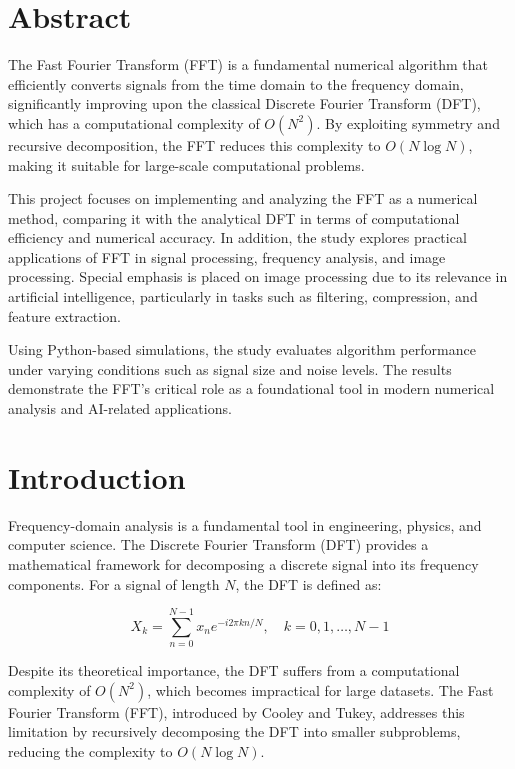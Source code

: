 \documentclass{zc-ust-hw}
\begin{document}
\maketitle
\tableofcontents
\pagebreak

\section{Abstract}
The Fast Fourier Transform (FFT) is a fundamental numerical algorithm that efficiently converts signals from the time domain to the frequency domain, significantly improving upon the classical Discrete Fourier Transform (DFT), which has a computational complexity of \(O(N^2)\). By exploiting symmetry and recursive decomposition, the FFT reduces this complexity to \(O(N \log N)\), making it suitable for large-scale computational problems.

This project focuses on implementing and analyzing the FFT as a numerical method, comparing it with the analytical DFT in terms of computational efficiency and numerical accuracy. In addition, the study explores practical applications of FFT in signal processing, frequency analysis, and image processing. Special emphasis is placed on image processing due to its relevance in artificial intelligence, particularly in tasks such as filtering, compression, and feature extraction.

Using Python-based simulations, the study evaluates algorithm performance under varying conditions such as signal size and noise levels. The results demonstrate the FFT’s critical role as a foundational tool in modern numerical analysis and AI-related applications.

\section{Introduction}
Frequency-domain analysis is a fundamental tool in engineering, physics, and computer science. The Discrete Fourier Transform (DFT) provides a mathematical framework for decomposing a discrete signal into its frequency components. For a signal of length \(N\), the DFT is defined as:

\begin{equation}
X_k = \sum_{n=0}^{N-1} x_n e^{-i 2\pi kn/N}, \quad k = 0,1,\dots,N-1
\end{equation}

Despite its theoretical importance, the DFT suffers from a computational complexity of \(O(N^2)\), which becomes impractical for large datasets. The Fast Fourier Transform (FFT), introduced by Cooley and Tukey, addresses this limitation by recursively decomposing the DFT into smaller subproblems, reducing the complexity to \(O(N \log N)\).
\end{document}

